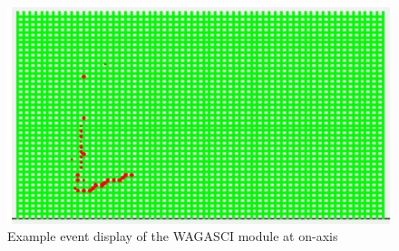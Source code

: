 \begin{figure}[tbh]
\begin{center}
\includegraphics[width=0.8\linewidth]{fig/wagasci_event_display.pdf}
\end{center}
\caption{
Example event display of the WAGASCI module at on-axis}
\label{fig:onaxis_eventdisplay}
\end{figure}



